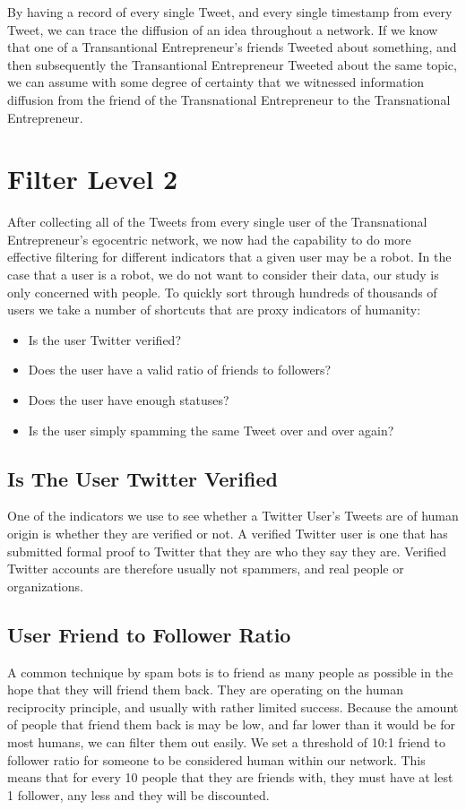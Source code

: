 By having a record of every single Tweet, and every single
timestamp from every Tweet, we can trace the diffusion of an idea
throughout a network. If we know that one of a Transantional
Entrepreneur's friends Tweeted about something, and then subsequently
the Transantional Entrepreneur Tweeted about the same topic, we can
assume with some degree of certainty that we witnessed information
diffusion from the friend of the Transnational Entrepreneur to the
Transnational Entrepreneur.

\section{Filter Level 2}
After collecting all of the Tweets from every single user of the
Transnational Entrepreneur's egocentric network, we now had the
capability to do more effective filtering for different indicators
that a given user may be a robot. In the case that a user is a robot,
we do not want to consider their data, our study is only concerned
with people. To quickly sort through hundreds of thousands of users we
take a number of shortcuts that are proxy indicators of humanity:

\begin{itemize}
\item Is the user Twitter verified?
\item Does the user have a valid ratio of friends to followers?
\item Does the user have enough statuses?
\item Is the user simply spamming the same Tweet over and over again?
\end{itemize}

\subsection{Is The User Twitter Verified}
One of the indicators we use to see whether a Twitter User's Tweets
are of human origin is whether they are verified or not. A verified
Twitter user is one that has submitted formal proof to Twitter that
they are who they say they are. Verified Twitter accounts are
therefore usually not spammers, and real people or organizations.

\subsection{User Friend to Follower Ratio}
A common technique by spam bots is to friend as many people as
possible in the hope that they will friend them back. They are
operating on the human reciprocity principle, and usually with rather
limited success. Because the amount of people that friend them back is
may be low, and far lower than it would be for most humans, we can
filter them out easily. We set a threshold of 10:1 friend to follower
ratio for someone to be considered human within our network. This
means that for every 10 people that they are friends with, they must
have at lest 1 follower, any less and they will be discounted.

